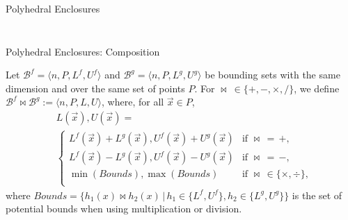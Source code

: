 \begin{frame}[fragile]{Polyhedral Enclosures}
\begin{columns}
\begin{column}{0.6\textwidth}
\begin{figure}
{}
            \end{figure}
        \end{column}
    \end{columns}
\end{frame}

\begin{frame}[fragile]{Polyhedral Enclosures: Composition}
    \begin{definition}
        Let $\mathcal{B}^f = \langle n, P, L^f, U^f \rangle$ and $\mathcal{B}^g = \langle n, P, L^g, U^g \rangle$ be bounding sets with the same dimension and over the same set of points $P$.  For $\bowtie\ \in\{+,-,\times,/\}$, we define $\mathcal{B}^f \bowtie \mathcal{B}^g := \langle n, P, L, U \rangle$, where, for all $\vec{x} \in P$,
            \begin{align*} 
            &L(\vec{x}), U(\vec{x}) = \\
            &\begin{cases}
                L^f(\vec{x}) + L^g(\vec{x}), U^f(\vec{x}) + U^g(\vec{x}) & \text{if } \bowtie \, = \,+, \\[0.1ex]
                L^f(\vec{x}) - L^g(\vec{x}), U^f(\vec{x}) - U^g(\vec{x}) & \text{if } \bowtie \, = \,-, \\[0.1ex]
                \min(\mathit{Bounds}),\max(\mathit{Bounds})  & \text{if } \bowtie \, \in \{\times, \div\}, \\[0.1ex]
            \end{cases}
            \end{align*}
            where $\mathit{Bounds} = \{h_1(x) \bowtie h_2(x) \,|\, h_1 \in \{L^f, U^f\}, h_2 \in \{L^g, U^g\} \}$ is the set of potential bounds when using multiplication or division.
        \end{definition}
        
\end{frame}

